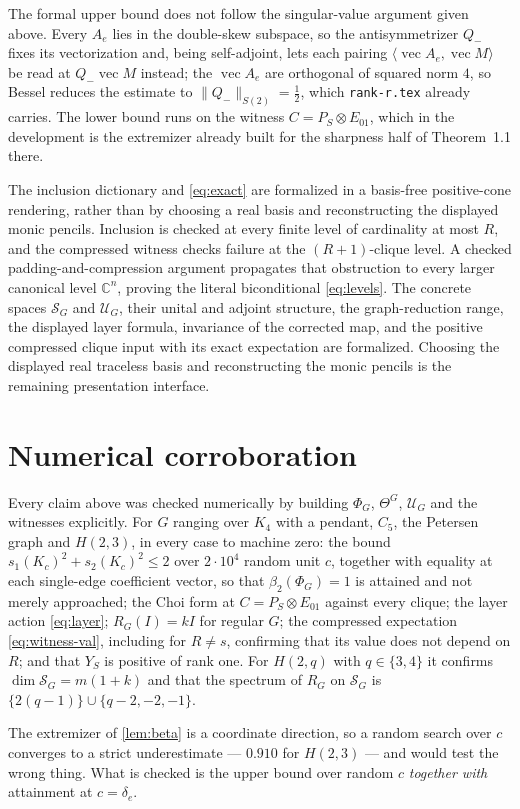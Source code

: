 \documentclass[11pt,reqno]{amsart}
\theoremstyle{plain}
\theoremstyle{remark}
\newcommand{\cS}{\mathcal S}
\newcommand{\cU}{\mathcal U}
\newcommand{\ip}[2]{\langle #1,#2\rangle}
\newcommand{\norm}[1]{\lVert #1\rVert}
\begin{document}
The formal upper bound does not follow the singular-value argument given above.
Every $A_e$ lies in the double-skew subspace, so the antisymmetrizer $Q_-$ fixes
its vectorization and, being self-adjoint, lets each pairing
$\ip{\operatorname{vec}A_e}{\operatorname{vec}M}$ be read at
$Q_-\operatorname{vec}M$ instead; the $\operatorname{vec}A_e$ are orthogonal of
squared norm $4$, so Bessel reduces the estimate to
$\norm{Q_-}_{S(2)}=\frac12$, which \texttt{rank-r.tex} already carries.  The
lower bound runs on the witness $C=P_S\otimes E_{01}$, which in the development
is the extremizer already built for the sharpness half of Theorem~1.1 there.

The inclusion dictionary and \cref{eq:exact} are formalized in a basis-free
positive-cone rendering, rather than by choosing a real basis and reconstructing
the displayed monic pencils.  Inclusion is checked at every finite level of
cardinality at most $R$, and the compressed witness checks failure at the
$(R+1)$-clique level.  A checked padding-and-compression argument propagates
that obstruction to every larger canonical level $\mathbb C^n$, proving the
literal biconditional \cref{eq:levels}.  The concrete spaces $\cS_G$ and
$\cU_G$, their unital and adjoint structure, the graph-reduction range, the
displayed layer formula, invariance of the corrected map, and the positive
compressed clique input with its exact expectation are formalized.  Choosing
the displayed real traceless basis and reconstructing the monic pencils is the
remaining presentation interface.

\section*{Numerical corroboration}

Every claim above was checked numerically by building $\Phi_G$, $\Theta^G$,
$\cU_G$ and the witnesses explicitly.  For $G$ ranging over $K_4$ with a
pendant, $C_5$, the Petersen graph and $H(2,3)$, in every case to
machine zero: the bound $s_1(K_c)^2+s_2(K_c)^2\le2$ over $2\cdot10^4$ random
unit $c$, together with equality at each single-edge coefficient vector, so that
$\beta_2(\Phi_G)=1$ is attained and not merely approached; the Choi form at
$C=P_S\otimes E_{01}$ against every clique; the layer action \cref{eq:layer};
$R_G(I)=kI$ for regular $G$; the compressed expectation \cref{eq:witness-val},
including for $R\neq s$, confirming that its value does not depend on $R$; and
that $Y_S$ is positive of rank one.  For $H(2,q)$ with $q\in\{3,4\}$ it confirms
$\dim\cS_G=m(1+k)$ and that the spectrum of $R_G$ on $\cS_G$ is
$\{2(q-1)\}\cup\{q-2,-2,-1\}$.

The extremizer of \cref{lem:beta} is a coordinate direction, so a random search
over $c$ converges to a strict underestimate --- $0.910$ for $H(2,3)$ --- and
would test the wrong thing.  What is checked is the upper bound over random $c$
\emph{together with} attainment at $c=\delta_e$.
\end{document}
